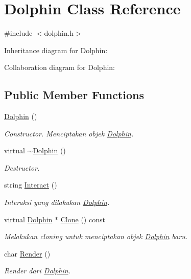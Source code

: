 \hypertarget{classDolphin}{}\section{Dolphin Class Reference}
\label{classDolphin}


{\ttfamily \#include $<$dolphin.\+h$>$}



Inheritance diagram for Dolphin\+:


Collaboration diagram for Dolphin\+:
\subsection*{Public Member Functions}
\begin{DoxyCompactItemize}
\item 
\hyperlink{classDolphin_a571a22b2c3cece5c8175ff49640b35bc}{Dolphin} ()
\begin{DoxyCompactList}\small\item\em Constructor. Menciptakan objek \hyperlink{classDolphin}{Dolphin}. \end{DoxyCompactList}\item 
virtual \hyperlink{classDolphin_a5c11950fe5675f3c36001f20a12343af}{$\sim$\+Dolphin} ()
\begin{DoxyCompactList}\small\item\em Destructor. \end{DoxyCompactList}\item 
string \hyperlink{classDolphin_a592506c38c185d7d383ae755deb9bd72}{Interact} ()
\begin{DoxyCompactList}\small\item\em Interaksi yang dilakukan \hyperlink{classDolphin}{Dolphin}. \end{DoxyCompactList}\item 
virtual \hyperlink{classDolphin}{Dolphin} $\ast$ \hyperlink{classDolphin_a4be3892432206693d2fae815303e07c4}{Clone} () const 
\begin{DoxyCompactList}\small\item\em Melakukan cloning untuk menciptakan objek \hyperlink{classDolphin}{Dolphin} baru. \end{DoxyCompactList}\item 
char \hyperlink{classDolphin_aa051d8ebe93c1c11b503ae76d07cd178}{Render} ()
\begin{DoxyCompactList}\small\item\em Render dari \hyperlink{classDolphin}{Dolphin}. \end{DoxyCompactList}\end{DoxyCompactItemize}
